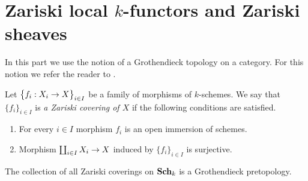 \section{Zariski local $k$-functors and Zariski sheaves}
\noindent
In this part we use the notion of a Grothendieck topology on a category. For this notion we refer the reader to \cite{Sheaves}.

\begin{definition}
Let $\big\{f_i:X_i\rightarrow X\big\}_{i\in I}$ be a family of morphisms of $k$-schemes. We say that $\{f_i\}_{i\in I}$ is \textit{a Zariski covering of $X$} if the following conditions are satisfied.
\begin{enumerate}[label=\textbf{(\arabic*)}, leftmargin=1.5em]
\item For every $i\in I$ morphism $f_i$ is an open immersion of schemes.
\item Morphism $\coprod_{i\in I}X_i\rightarrow X$ induced by $\big\{f_i\big\}_{i\in I}$ is surjective.
\end{enumerate}
\end{definition}
\noindent
The collection of all Zariski coverings on $\mathbf{Sch}_k$ is a Grothendieck pretopology.

